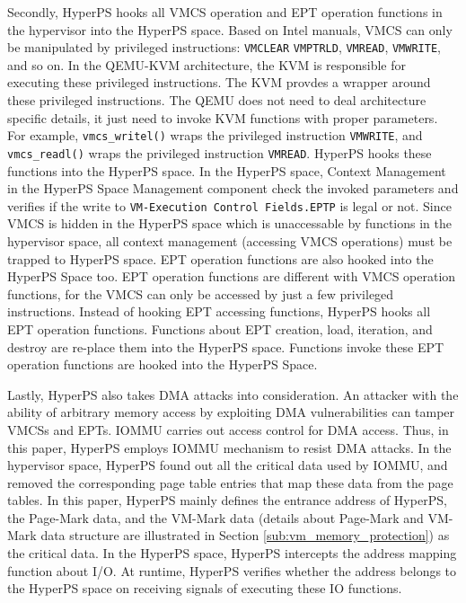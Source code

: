 Secondly,  HyperPS hooks all VMCS operation and EPT operation functions in the hypervisor into the HyperPS space.
Based on Intel manuals, VMCS can only be manipulated by privileged instructions: \verb|VMCLEAR| \verb|VMPTRLD|, \verb|VMREAD|, \verb|VMWRITE|, and so on.
In the QEMU-KVM architecture, the KVM is responsible for executing these privileged instructions. The KVM provdes a wrapper around these privileged instructions. The QEMU does not need to deal architecture specific details, it just need to invoke KVM functions with proper parameters. 
For example, \verb|vmcs_writel()| wraps the privileged instruction \verb|VMWRITE|, and \verb|vmcs_readl()| wraps the privileged instruction \verb|VMREAD|.
HyperPS hooks these functions into the HyperPS space. In the HyperPS space, Context Management in the HyperPS Space Management component check the invoked parameters and verifies if the write to \verb|VM-Execution Control Fields.EPTP| is legal or not. 
Since VMCS is hidden in the HyperPS space which is unaccessable by functions in the hypervisor space, all context management (accessing VMCS operations) must be trapped to HyperPS space. 
EPT operation functions are also hooked into the HyperPS Space too. EPT operation functions are different with VMCS operation functions, for the VMCS can only be accessed by just a few privileged instructions. Instead of hooking EPT accessing functions, HyperPS hooks all EPT operation functions. Functions about EPT creation, load, iteration, and destroy are re-place them into the HyperPS space. Functions invoke these EPT operation functions are hooked into the HyperPS Space.


Lastly, HyperPS also takes DMA attacks into consideration. An attacker with the ability of arbitrary memory access by exploiting DMA vulnerabilities can tamper VMCSs and EPTs. IOMMU carries out access control for DMA access. Thus, in this paper, HyperPS employs IOMMU mechanism to resist DMA attacks.
In the hypervisor space, HyperPS found out all the critical data used by IOMMU, and removed the corresponding page table entries that map these data from the page tables. In this paper, HyperPS mainly defines the entrance address of HyperPS, the Page-Mark data, and the VM-Mark data (details about Page-Mark and VM-Mark data structure are illustrated in Section \ref{sub:vm_memory_protection}) as the critical data.
In the HyperPS space, HyperPS intercepts the address mapping function about I/O. At runtime, HyperPS verifies whether the address belongs to the HyperPS space on receiving signals of executing these IO functions. 


